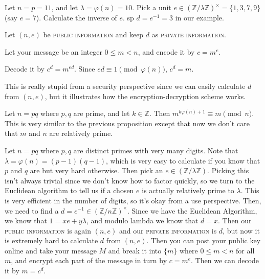 \begin{example}
Let $n = p = 11$, and let $\lambda = \varphi(n) = 10$. Pick a unit $e \in (\mathbb{Z}/\lambda\mathbb{Z})^\times = \{1,3,7,9\}$ (say $e = 7$). Calculate the inverse of $e$. sp $d = e^{-1} = 3$ in our example.

\noindent
Let $(n,e)$ be \textsc{public information} and keep $d$ as \textsc{private information}.

\noindent
Let your message be an integer $0 \leq m < n$, and encode it by $c = m^e$.

\noindent
Decode it by $c^d = m^{ed}$. Since $ed \equiv 1 \pmod{\varphi(n)}$, $c^d = m$.

\noindent
This is really stupid from a security perspective since we can easily calculate $d$ from $(n,e)$, but it illustrates how the encryption-decryption scheme works.
\end{example}

\begin{proposition}
Let $n = pq$ where $p,q$ are prime, and let $k \in \mathbb{Z}$. Then $m^{k \varphi(n) + 1} \equiv m \pmod{n}$. This is very similar to the previous proposition except that now we don't care that $m$ and $n$ are relatively prime.
\end{proposition}

\begin{theorem}[RSA]
Let $n = pq$ where $p,q$ are distinct primes with very many digits. Note that $\lambda = \varphi(n) = (p-1)(q-1)$, which is very easy to calculate if you know that $p$ and $q$ are but very hard otherwise. Then pick an $e \in (\mathbb{Z}/\lambda\mathbb{Z})$. Picking this isn't always trivial since we don't know how to factor quickly, so we turn to the Euclidean algorithm to tell us if a chosen $e$ is actually relatively prime to $\lambda$. This is very efficient in the number of digits, so it's okay from a use perspective. Then, we need to find a $d = e^{-1} \in (\mathbb{Z}/n\mathbb{Z})^\times$. Since we have the Euclidean Algorithm, we know that $1 = xe + y\lambda$, and modulo lambda we know that $d = x$. Then our \textsc{public information} is again $(n,e)$ and our \textsc{private information} is $d$, but now it is extremely hard to calculate $d$ from $(n,e)$. Then you can post your public key online and take your message $M$ and break it into $\{m\}$ where $0 \leq m < n$ for all $m$, and encrypt each part of the message in turn by $c = m^e$. Then we can decode it by $m = c^d$.
\end{theorem}